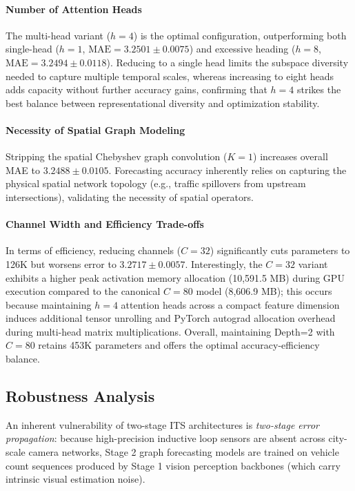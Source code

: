 \documentclass[journal,twocolumn]{IEEEtran}
\begin{document}
\paragraph{Number of Attention Heads} The multi-head variant ($h=4$) is the optimal configuration, outperforming both single-head ($h=1$, $\text{MAE} = 3.2501 \pm 0.0075$) and excessive heading ($h=8$, $\text{MAE} = 3.2494 \pm 0.0118$). Reducing to a single head limits the subspace diversity needed to capture multiple temporal scales, whereas increasing to eight heads adds capacity without further accuracy gains, confirming that $h=4$ strikes the best balance between representational diversity and optimization stability.

\paragraph{Necessity of Spatial Graph Modeling} Stripping the spatial Chebyshev graph convolution ($K=1$) increases overall MAE to $3.2488 \pm 0.0105$. Forecasting accuracy inherently relies on capturing the physical spatial network topology (e.g., traffic spillovers from upstream intersections), validating the necessity of spatial operators.

\paragraph{Channel Width and Efficiency Trade-offs} In terms of efficiency, reducing channels ($C=32$) significantly cuts parameters to 126K but worsens error to $3.2717 \pm 0.0057$. Interestingly, the $C=32$ variant exhibits a higher peak activation memory allocation (10,591.5 MB) during GPU execution compared to the canonical $C=80$ model (8,606.9 MB); this occurs because maintaining $h=4$ attention heads across a compact feature dimension induces additional tensor unrolling and PyTorch autograd allocation overhead during multi-head matrix multiplications. Overall, maintaining Depth=2 with $C=80$ retains 453K parameters and offers the optimal accuracy-efficiency balance.

\subsection{Robustness Analysis}
\label{sec:noise_robustness}

An inherent vulnerability of two-stage ITS architectures is \emph{two-stage error propagation}: because high-precision inductive loop sensors are absent across city-scale camera networks, Stage 2 graph forecasting models are trained on vehicle count sequences produced by Stage 1 vision perception backbones (which carry intrinsic visual estimation noise).
\end{document}
